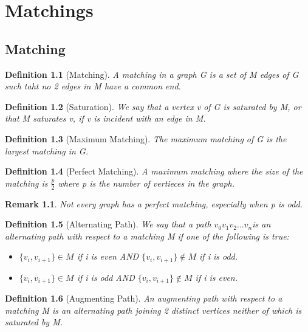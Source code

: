 \documentclass[11pt, oneside]{book}
\theoremstyle{break}
\newtheorem{defn}{Definition}[section]
\newtheorem*{remark}{Remark}
\begin{document}
\chapter{Matchings}

\section{Matching}

\begin{defn}[Matching]
	A matching in a graph G is a set of M edges of G such taht no 2 edges in M have a common end.
\end{defn}

\begin{defn}[Saturation]
	We say that a vertex v of G is saturated by M, or that M saturates v, if v is incident with an edge in M.
\end{defn}

\begin{defn}[Maximum Matching]
	The maximum matching of G is the largest matching in G.
\end{defn}

\begin{defn}[Perfect Matching]
	A maximum matching where the size of the matching is $\frac{p}{2}$ where p is the number of vertieces in the graph.
\end{defn}

\begin{remark}
	Not every graph has a perfect matching, especially when p is odd.
\end{remark}

\begin{defn}[Alternating Path]
	We say that a path $v_0v_1v_2\hdots v_n$is an alternating path with respect to a matching M if one of the following is true:
	\begin{itemize}
		\item $\{v_i, v_{i+1}\} \in M$ if i is even AND $\{v_i, v_{i+1}\} \notin M$ if i is odd.
		\item $\{v_i, v_{i+1}\} \in M$ if i is odd AND $\{v_i, v_{i+1}\} \notin M$ if i is even.
	\end{itemize}
\end{defn}

\begin{defn}[Augmenting Path]
	An augmenting path with respect to a matching M is an alternating path joining 2 distinct vertices neither of which is saturated by M.
\end{defn}
\end{document}
